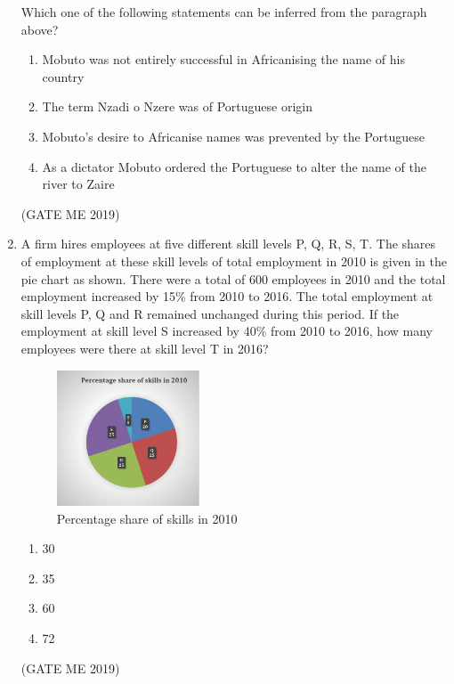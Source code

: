 \documentclass[journal]{IEEEtran}
\begin{document}
\begin{enumerate}
Which one of the following statements can be inferred from the paragraph above?
\begin{enumerate}
    \item Mobuto was not entirely successful in Africanising the name of his country
    \item The term Nzadi o Nzere was of Portuguese origin
    \item Mobuto's desire to Africanise names was prevented by the Portuguese
    \item As a dictator Mobuto ordered the Portuguese to alter the name of the river to Zaire
\end{enumerate}
\hfill (GATE ME 2019)

\item A firm hires employees at five different skill levels P, Q, R, S, T. The shares of employment at these skill levels of total employment in 2010 is given in the pie chart as shown. There were a total of 600 employees in 2010 and the total employment increased by 15\% from 2010 to 2016. The total employment at skill levels P, Q and R remained unchanged during this period. If the employment at skill level S increased by 40\% from 2010 to 2016, how many employees were there at skill level T in 2016?

\begin{figure}[H]
\centering
\includegraphics[width=0.4\textwidth]{Fig 1.png}
\caption{Percentage share of skills in 2010}
\label{fig:question9}
\end{figure}

\begin{multicols}{4}
\begin{enumerate}
    \item 30
    \item 35
    \item 60
    \item 72
\end{enumerate}
\end{multicols}
\hfill (GATE ME 2019)



\end{enumerate}
\end{document}
